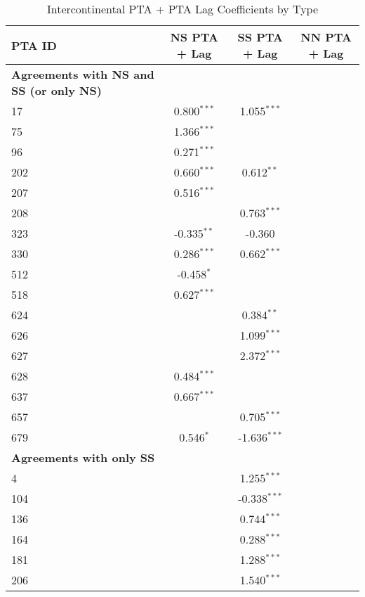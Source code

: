\begin{table}[htbp]
    \centering
    \caption{Intercontinental PTA + PTA Lag Coefficients by Type}
    \label{tab:intercontinental_pta}
    \begin{adjustbox}{max width=\textwidth}
    \begin{tabular}{lccc}
    \hline
    \textbf{PTA ID} & \textbf{NS PTA + Lag} & \textbf{SS PTA + Lag} & \textbf{NN PTA + Lag} \\
    \hline
    \textbf{Agreements with NS and SS (or only NS)} &  &  &  \\
    \hline
    17  & 0.800$^{\ast\ast\ast}$ & 1.055$^{\ast\ast\ast}$ &  \\
    75  & 1.366$^{\ast\ast\ast}$ &  &  \\
    96  & 0.271$^{\ast\ast\ast}$ &  &  \\
    202 & 0.660$^{\ast\ast\ast}$ & 0.612$^{\ast\ast}$ &  \\
    207 & 0.516$^{\ast\ast\ast}$ &  &  \\
    208 &  & 0.763$^{\ast\ast\ast}$ &  \\
    323 & -0.335$^{\ast\ast}$ & -0.360 &  \\
    330 & 0.286$^{\ast\ast\ast}$ & 0.662$^{\ast\ast\ast}$ &  \\
    512 & -0.458$^{\ast}$ &  &  \\
    518 & 0.627$^{\ast\ast\ast}$ &  &  \\
    624 &  & 0.384$^{\ast\ast}$ &  \\
    626 &  & 1.099$^{\ast\ast\ast}$ &  \\
    627 &  & 2.372$^{\ast\ast\ast}$ &  \\
    628 & 0.484$^{\ast\ast\ast}$ &  &  \\
    637 & 0.667$^{\ast\ast\ast}$ &  &  \\
    657 &  & 0.705$^{\ast\ast\ast}$ &  \\
    679 & 0.546$^{\ast}$ & -1.636$^{\ast\ast\ast}$ &  \\
    \hline
    \textbf{Agreements with only SS} &  &  &  \\
    \hline
    4   &  & 1.255$^{\ast\ast\ast}$ &  \\
    104 &  & -0.338$^{\ast\ast\ast}$ &  \\
    136 &  & 0.744$^{\ast\ast\ast}$ &  \\
    164 &  & 0.288$^{\ast\ast\ast}$ &  \\
    181 &  & 1.288$^{\ast\ast\ast}$ &  \\
    206 &  & 1.540$^{\ast\ast\ast}$ &  \\

\end{tabular}
\end{adjustbox}
\end{table}
